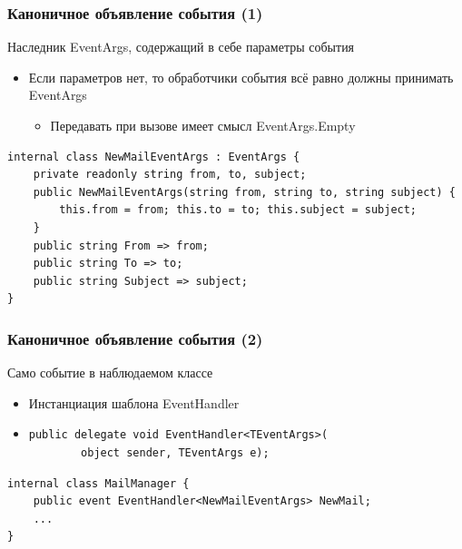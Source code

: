 \documentclass{../../slides-style}
\begin{document}
    \begin{frame}[fragile]
        \frametitle{Каноничное объявление события (1)}
        Наследник EventArgs, содержащий в себе параметры события
        \begin{itemize}
            \item Если параметров нет, то обработчики события всё равно должны принимать EventArgs
            \begin{itemize}
                \item Передавать при вызове имеет смысл EventArgs.Empty
            \end{itemize}
        \end{itemize}

        \vspace{3mm}
        \begin{verbatim}
internal class NewMailEventArgs : EventArgs {
    private readonly string from, to, subject;
    public NewMailEventArgs(string from, string to, string subject) {
        this.from = from; this.to = to; this.subject = subject;
    }
    public string From => from;
    public string To => to;
    public string Subject => subject;
}
        \end{verbatim}
    \end{frame}

    \begin{frame}[fragile]
        \frametitle{Каноничное объявление события (2)}
        Само событие в наблюдаемом классе
        \begin{itemize}
            \item Инстанциация шаблона EventHandler
            \item 
                \begin{verbatim}
public delegate void EventHandler<TEventArgs>(
        object sender, TEventArgs e);
                \end{verbatim}
        \end{itemize}

        \vspace{7mm}
        \begin{verbatim}
internal class MailManager {
    public event EventHandler<NewMailEventArgs> NewMail;
    ...
}
        \end{verbatim}
    \end{frame}
\end{document}
